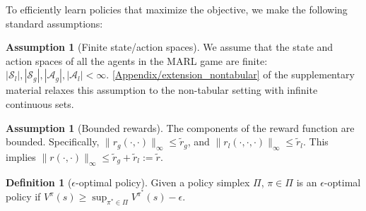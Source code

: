 \documentclass{article}
\theoremstyle{plain}
\theoremstyle{definition}
\newtheorem{definition}[theorem]{Definition}
\newtheorem{assumption}[theorem]{Assumption}
\begin{document}
To efficiently learn policies that maximize the objective, we make the following standard assumptions:
\begin{assumption}[Finite state/action spaces]\label{assumption: finite cardinality}
    We assume that the state and action spaces of all the agents in the MARL game are finite:  $|\mathcal{S}_l|, |\mathcal{S}_g|, |\mathcal{A}_g|, |\mathcal{A}_l| < \infty$. \cref{Appendix/extension_nontabular} of the supplementary material relaxes this assumption to the non-tabular setting with infinite continuous sets.
\end{assumption}
\begin{assumption}[Bounded rewards]\label{assumption: bounded rewards}
    The components of the reward function are bounded. Specifically, $\|r_g(\cdot,\cdot)\|_\infty \leq \tilde{r}_g$, and
    $\|r_l(\cdot,\cdot,\cdot)\|_\infty \leq \tilde{r}_l$. This implies $\|r(\cdot,\cdot)\|_\infty \leq \tilde{r}_g + \tilde{r}_l := \tilde{r}$.
\end{assumption}

\begin{definition}[$\epsilon$-optimal policy] Given a policy simplex $\Pi$, $\pi\in\Pi$ is an $\epsilon$-optimal policy if $V^\pi(s) \geq \sup_{\pi^*\in\Pi} V^{\pi^*}(s) - \epsilon$.
\end{definition}
\end{document}
